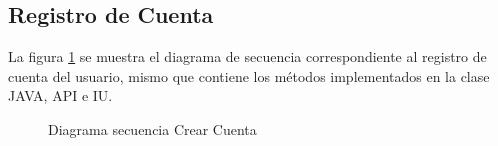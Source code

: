 \subsection{Registro de Cuenta}
La figura \ref{fig:SecuenciaCuenta} se muestra el diagrama de secuencia correspondiente al registro de cuenta del usuario, mismo que contiene los métodos implementados en la clase JAVA, API e IU.
\begin{figure}[htbp!]
	\centering
	\caption{Diagrama secuencia Crear Cuenta}
	\label{fig:SecuenciaCuenta}
\end{figure}

